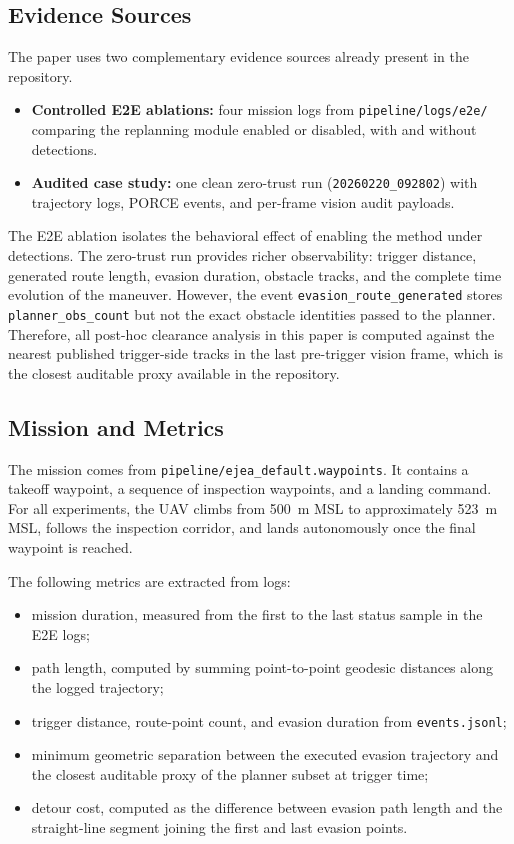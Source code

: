 \documentclass[journal,twoside,web]{ieeecolor}
\begin{document}
\subsection{Evidence Sources}

The paper uses two complementary evidence sources already present in the repository.

\begin{itemize}

    \item \textbf{Controlled E2E ablations:} four mission logs from \texttt{pipeline/logs/e2e/} comparing the replanning module enabled or disabled, with and without detections.
    \item \textbf{Audited case study:} one clean zero-trust run (\texttt{20260220\_092802}) with trajectory logs, PORCE events, and per-frame vision audit payloads.
\end{itemize}

The E2E ablation isolates the behavioral effect of enabling the method under detections. The zero-trust run provides richer observability: trigger distance, generated route length, evasion duration, obstacle tracks, and the complete time evolution of the maneuver. However, the event \texttt{evasion\_route\_generated} stores \texttt{planner\_obs\_count} but not the exact obstacle identities passed to the planner. Therefore, all post-hoc clearance analysis in this paper is computed against the nearest published trigger-side tracks in the last pre-trigger vision frame, which is the closest auditable proxy available in the repository.

\subsection{Mission and Metrics}

The mission comes from \texttt{pipeline/ejea\_default.waypoints}. It contains a takeoff waypoint, a sequence of inspection waypoints, and a landing command. For all experiments, the UAV climbs from \SI{500}{\meter} MSL to approximately \SI{523}{\meter} MSL, follows the inspection corridor, and lands autonomously once the final waypoint is reached.

The following metrics are extracted from logs:
\begin{itemize}
    \item mission duration, measured from the first to the last status sample in the E2E logs;
    \item path length, computed by summing point-to-point geodesic distances along the logged trajectory;
    \item trigger distance, route-point count, and evasion duration from \texttt{events.jsonl};
    \item minimum geometric separation between the executed evasion trajectory and the closest auditable proxy of the planner subset at trigger time;
    \item detour cost, computed as the difference between evasion path length and the straight-line segment joining the first and last evasion points.
\end{itemize}
\end{document}
